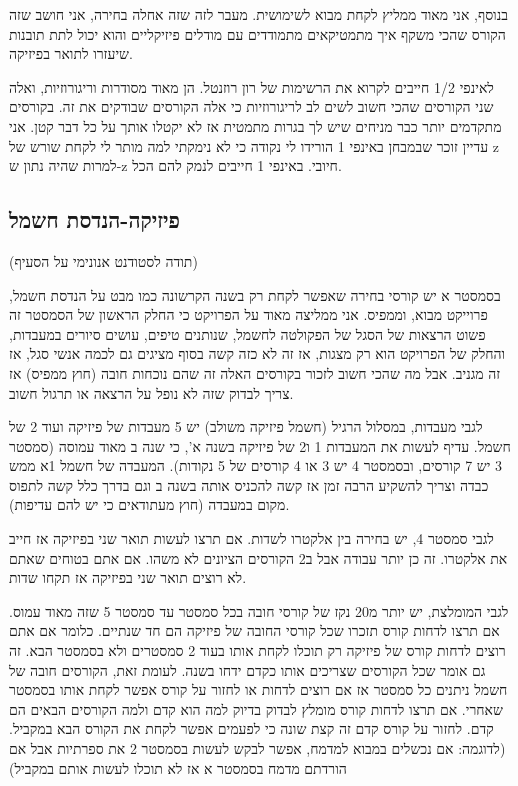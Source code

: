\documentclass[a4paper,12pt]{article}
\begin{document}
בנוסף, אני מאוד ממליץ לקחת מבוא לשימושית. מעבר לזה שזה אחלה בחירה, אני חושב שזה הקורס שהכי משקף איך מתמטיקאים מתמודדים עם מודלים פיזיקליים והוא יכול לתת תובנות שיעזרו לתואר בפיזיקה.

לאינפי 1/2 חייבים לקרוא את הרשימות של רון רוזנטל. הן מאוד מסודרות וריגורוזיות, ואלה שני הקורסים שהכי חשוב לשים לב לריגורוזיות כי אלה הקורסים שבודקים את זה. בקורסים מתקדמים יותר כבר מניחים שיש לך בגרות מתמטית אז לא יקטלו אותך על כל דבר קטן. אני עדיין זוכר שבמבחן באינפי 1 הורידו לי נקודה כי לא נימקתי למה מותר לי לקחת שורש של z למרות שהיה נתון ש-z חיובי. באינפי 1 חייבים לנמק להם הכל.

\subsection{פיזיקה-הנדסת חשמל}

(תודה לסטודנט אנונימי על הסעיף)

בסמסטר א יש קורסי בחירה שאפשר לקחת רק בשנה הקרשונה כמו מבט על הנדסת חשמל, פרוייקט מבוא, וממפיס. אני ממליצה מאוד על הפרויקט כי החלק הראשון של הסמסטר זה פשוט הרצאות של הסגל של הפקולטה לחשמל, שנותנים טיפים, עושים סיורים במעבדות, והחלק של הפרויקט הוא רק מצגות, אז זה לא כזה קשה בסוף מציגים גם לכמה אנשי סגל, אז זה מגניב. אבל מה שהכי חשוב לזכור בקורסים האלה זה שהם נוכחות חובה (חוץ ממפיס) אז צריך לבדוק שזה לא נופל על הרצאה או תרגול חשוב.

לגבי מעבדות, במסלול הרגיל (חשמל פיזיקה משולב) יש 5 מעבדות של פיזיקה ועוד 2 של חשמל. עדיף לעשות את המעבדות 1 ו2 של פיזיקה בשנה א', כי שנה ב מאוד עמוסה (סמסטר 3 יש 7 קורסים, ובסמסטר 4 יש 3 או 4 קורסים של 5 נקודות). המעבדה של חשמל 1א ממש כבדה וצריך להשקיע הרבה זמן אז קשה להכניס אותה בשנה ב וגם בדרך כלל קשה לתפוס מקום במעבדה (חוץ מעתודאים כי יש להם עדיפות).

לגבי סמסטר 4, יש בחירה בין אלקטרו לשדות. אם תרצו לעשות תואר שני בפיזיקה אז חייב את אלקטרו. זה כן יותר עבודה אבל ב2 הקורסים הציונים לא משהו. אם אתם בטוחים שאתם לא רוצים תואר שני בפיזיקה אז תקחו שדות.

לגבי המומלצת, יש יותר מ20 נקז של קורסי חובה בכל סמסטר עד סמסטר 5 שזה מאוד עמוס. אם תרצו לדחות קורס תזכרו שכל קורסי החובה של פיזיקה הם חד שנתיים. כלומר אם אתם רוצים לדחות קורס של פיזיקה רק תוכלו לקחת אותו בעוד 2 סמסטרים ולא בסמסטר הבא. זה גם אומר שכל הקורסים שצריכים אותו כקדם ידחו בשנה. לעומת זאת, הקורסים חובה של חשמל ניתנים כל סמסטר אז אם רוצים לדחות או לחזור על קורס אפשר לקחת אותו בסמסטר שאחרי. אם תרצו לדחות קורס מומלץ לבדוק בדיוק למה הוא קדם ולמה הקורסים הבאים הם קדם. לחזור על קורס קדם זה קצת שונה כי לפעמים אפשר לקחת את הקורס הבא במקביל. (לדוגמה: אם נכשלים במבוא למדמח, אפשר לבקש לעשות בסמסטר 2 את ספרתיות אבל אם הורדתם מדמח בסמסטר א אז לא תוכלו לעשות אותם במקביל)
\end{document}
